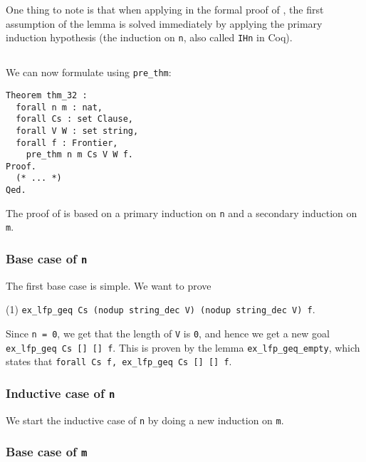One thing to note is that when applying  in the formal proof of ,
the first assumption of the lemma is solved immediately by applying the primary induction hypothesis
(the induction on \lstinline{n}, also called \lstinline{IHn} in Coq).

\subsection{}

We can now formulate  using \lstinline{pre_thm}:

\begin{minipage}{\linewidth}
\begin{lstlisting}[language=Coq, label={lst:thm_32}, caption={\Cref{thm:3.2} in Coq}]
Theorem thm_32 :
  forall n m : nat,
  forall Cs : set Clause,
  forall V W : set string,
  forall f : Frontier,
    pre_thm n m Cs V W f.
Proof.
  (* ... *)
Qed.
\end{lstlisting}
\end{minipage}

The proof of  is based on a primary induction on \lstinline{n} and a secondary induction on \lstinline{m}.

\subsubsection{Base case of \lstinline{n}}

The first base case is simple. We want to prove

(1) \tabto{2em}
\lstinline{ex_lfp_geq Cs (nodup string_dec V) (nodup string_dec V) f}.

Since \lstinline{n = 0}, we get that the length of \lstinline{V} is \lstinline{0},
and hence we get a new goal \lstinline{ex_lfp_geq Cs [] [] f}.
This is proven by the lemma \lstinline{ex_lfp_geq_empty},
which states that \lstinline{forall Cs f, ex_lfp_geq Cs [] [] f}.

\subsubsection{Inductive case of \lstinline{n}}

We start the inductive case of \lstinline{n} by doing a new induction on \lstinline{m}.

\subsubsection{Base case of \lstinline{m}}

